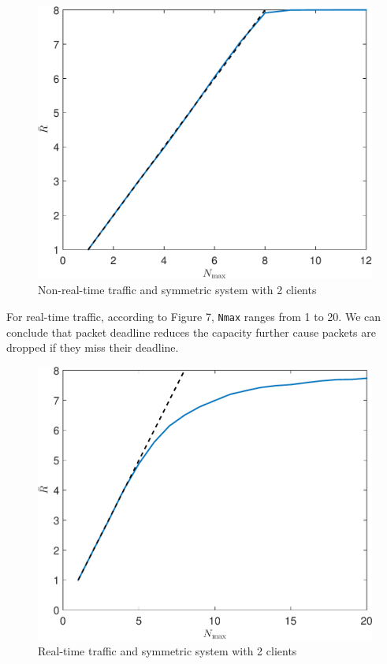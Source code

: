 \documentclass{article}
\begin{document}
\begin{figure}[H]
\centering
\includegraphics[scale=0.5]{nonrealtime_throughput_randmax.pdf}
\caption{Non-real-time traffic and symmetric system with 2 clients}
\end{figure}

For real-time traffic, according to Figure 7, \lstinline |Nmax| ranges from 1 to 20. We can conclude that packet deadline reduces the capacity further cause packets are dropped if they miss their deadline. 

\begin{figure}[H]
\centering
\includegraphics[scale=0.5]{realtime_throughput_randmax.pdf}
\caption{Real-time traffic and symmetric system with 2 clients}
\end{figure}
\end{document}
